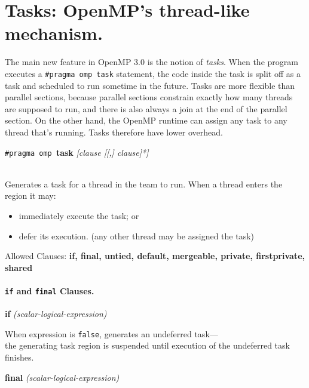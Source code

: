




\section*{Tasks: OpenMP's thread-like mechanism.}
The main new feature in OpenMP 3.0 is the notion of \emph{tasks}. When
the program executes a \verb+#pragma omp task+ statement, the code
inside the task is split off as a task and scheduled to run sometime
in the future. Tasks are more flexible than parallel sections, because
parallel sections constrain exactly how many threads are supposed to
run, and there is also always a join at the end of the parallel
section.  On the other hand, the OpenMP runtime can assign any task to
any thread that's running. Tasks therefore have lower overhead.


  \begin{center}
    {\tt \#pragma omp }{\bf task} {\it [clause [[,] clause]*]}
  \end{center}~\\

Generates a task for a thread in the team to run.
     When a thread enters the region it may:
\begin{itemize}
        \item immediately execute the task; or
        \item defer its execution. (any other thread may be assigned the task)
\end{itemize}

  Allowed Clauses: {\bf if, final, untied, default, mergeable, private,
  firstprivate, shared}

\paragraph{{\tt if} and {\tt final} Clauses.}

  \begin{center}
  {\bf if} {\it(scalar-logical-expression)}
  \end{center}

    When expression is {\tt false}, generates an undeferred task---\\
    the generating task region is suspended until execution of the
      undeferred task finishes.\\[1em]

  \begin{center}
  {\bf final} {\it(scalar-logical-expression)}
  \end{center}

